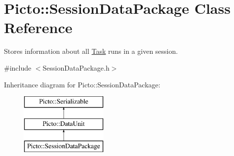 \hypertarget{class_picto_1_1_session_data_package}{\section{Picto\-:\-:Session\-Data\-Package Class Reference}
\label{class_picto_1_1_session_data_package}
}


Stores information about all \hyperlink{class_picto_1_1_task}{Task} runs in a given session.  




{\ttfamily \#include $<$Session\-Data\-Package.\-h$>$}

Inheritance diagram for Picto\-:\-:Session\-Data\-Package\-:\begin{figure}[H]
\begin{center}
\leavevmode
\includegraphics[height=3.000000cm]{class_picto_1_1_session_data_package}
\end{center}
\end{figure}
